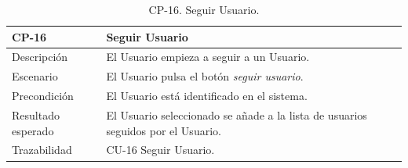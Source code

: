             \begin{table}[H]
                \centering
                \begin{tabularx}{1\textwidth} { 
                    | >{\raggedright\arraybackslash}X 
                    | >{\raggedright\arraybackslash}X 
                    | >{\raggedright\arraybackslash}X 
                    |  }
                \hline
                \textbf{CP-16}     & \textbf{Seguir Usuario}                             \\ \hline
                Descripción        & El Usuario empieza a seguir a un Usuario.      \\ \hline
                Escenario          & El Usuario pulsa el botón \textit{seguir usuario}.                         \\ \hline
                Precondición          & El Usuario está identificado en el sistema.                             \\ \hline
                
                Resultado esperado & El Usuario seleccionado se añade a la lista de usuarios seguidos por el Usuario. \\ \hline
                Trazabilidad & CU-16 Seguir Usuario.\\ \hline
            \end{tabularx}
            \caption{CP-16. Seguir Usuario.}
            \label{table:CP-16}
                \end{table}


